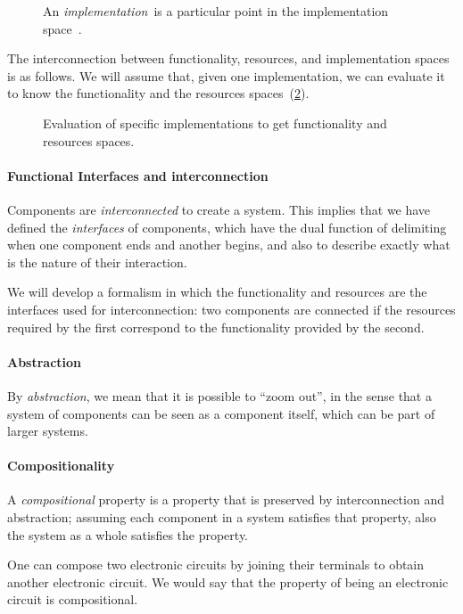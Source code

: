 \begin{figure}[h!]
    \centering
    \caption{An \emph{implementation}~\imp is a particular point in the implementation space~\impsp.}
    \label{fig:impspace}
\end{figure}

The interconnection between functionality, resources, and implementation spaces is as follows.
We will assume that, given one implementation, we can evaluate it to know the functionality and the resources spaces~(\cref{fig:FIR}).

\begin{figure}[h!]
    \centering
    \caption{Evaluation of specific implementations to get functionality and resources spaces.}
    \label{fig:FIR}
\end{figure}

\paragraph{Functional Interfaces and interconnection}
Components are \emph{interconnected} to create a system.
This implies that we have defined the \emph{interfaces} of components, which have the dual function of delimiting when one component ends and another begins, and also to describe exactly what is the nature of their interaction.

We will develop a formalism in which the functionality and resources are the interfaces used for interconnection: two components are connected if the resources required by the first correspond to the functionality provided by the second.

\paragraph{Abstraction}
By \emph{abstraction}, we mean that it is possible to ``zoom out'', in the sense that a system of components can be seen as a component itself, which can be part of larger systems.

\paragraph{Compositionality}
A \emph{compositional} property is a property that is preserved by interconnection and abstraction; assuming each component in a system satisfies that property, also the system as a whole satisfies the property.

\begin{example}
    One can compose two electronic circuits by joining their terminals to obtain another electronic circuit.
    We would say that the property of being an electronic circuit is compositional.
\end{example}


